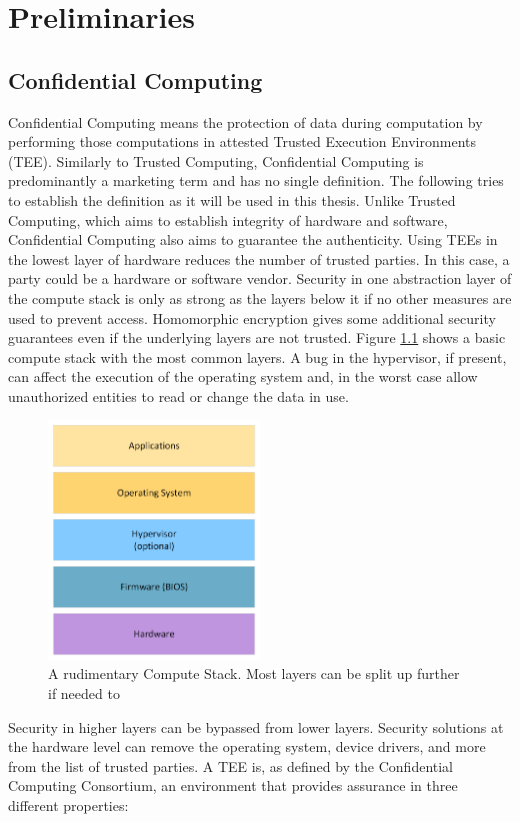 \chapter{Preliminaries}
\label{ch:Foundations}

\section{Confidential Computing}
\label{sec:Foundations:ConfComputing}
Confidential Computing means the protection of data during computation by performing those computations in attested Trusted Execution Environments (TEE). Similarly to Trusted Computing, Confidential Computing is predominantly a marketing term and has no single definition. The following tries to establish the definition as it will be used in this thesis. Unlike Trusted Computing, which aims to establish integrity of hardware and software, Confidential Computing also aims to guarantee the authenticity. Using TEEs in the lowest layer of hardware reduces the number of trusted parties. In this case, a party could be a hardware or software vendor. Security in one abstraction layer of the compute stack is only as strong as the layers below it if no other measures are used to prevent access. Homomorphic encryption gives some additional security guarantees even if the underlying layers are not trusted. Figure \ref{fig:computestack} shows a basic compute stack with the most common layers. A bug in the hypervisor, if present, can affect the execution of the operating system and, in the worst case allow unauthorized entities to read or change the data in use.
\begin{figure}
\centering
\includegraphics[width=0.5\textwidth]{figures/ComputeStack.png}
\caption{A rudimentary Compute Stack. Most layers can be split up further if needed to}
\label{fig:computestack}
\end{figure}Security in higher layers can be bypassed from lower layers. Security solutions at the hardware level can remove the operating system, device drivers, and more from the list of trusted parties. A TEE is, as defined by the Confidential Computing Consortium, an environment that provides assurance in three different properties:
